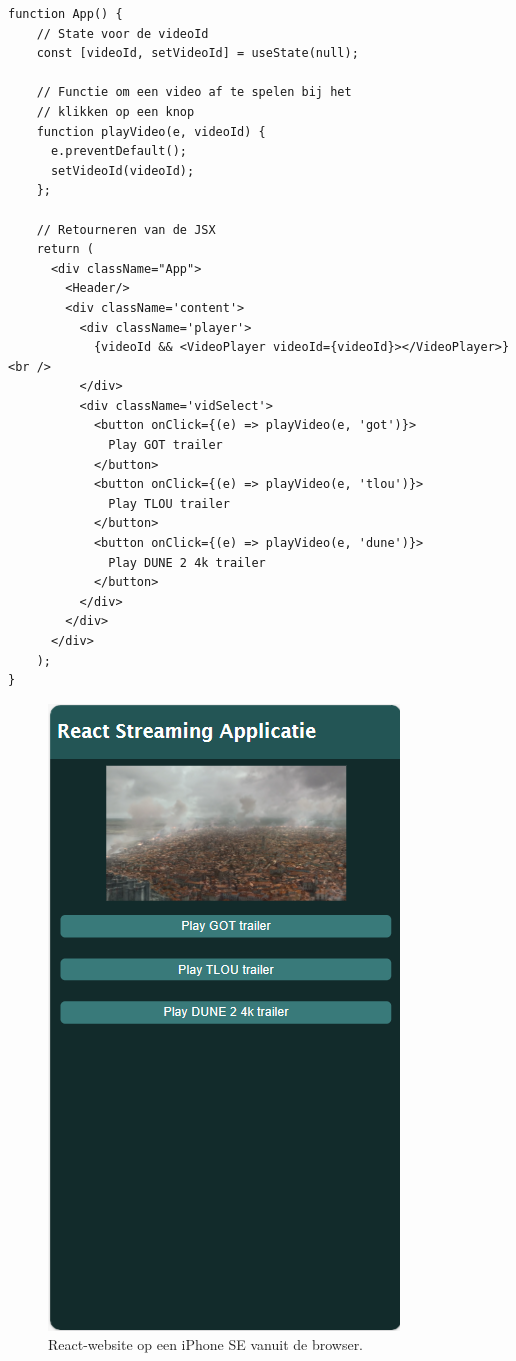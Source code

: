 \begin{mdframed}[backgroundcolor=bg]
  \begin{verbatim}
function App() {
    // State voor de videoId
    const [videoId, setVideoId] = useState(null);

    // Functie om een video af te spelen bij het 
    // klikken op een knop
    function playVideo(e, videoId) {
      e.preventDefault();
      setVideoId(videoId);
    };

    // Retourneren van de JSX
    return (
      <div className="App">
        <Header/>
        <div className='content'>
          <div className='player'>
            {videoId && <VideoPlayer videoId={videoId}></VideoPlayer>} <br />
          </div>
          <div className='vidSelect'>
            <button onClick={(e) => playVideo(e, 'got')}>
              Play GOT trailer
            </button>
            <button onClick={(e) => playVideo(e, 'tlou')}>
              Play TLOU trailer
            </button>
            <button onClick={(e) => playVideo(e, 'dune')}>
              Play DUNE 2 4k trailer
            </button>
          </div>
        </div>
      </div>
    );
}
  \end{verbatim}
\end{mdframed}


\begin{figure}
  \centering
  \includegraphics[width=0.7\linewidth]{img/ReactWebsiteIphone}
  \caption{React-website op een iPhone SE vanuit de browser.}
  \label{fig:React-website op een iPhone SE vanuit de browser}
\end{figure}


